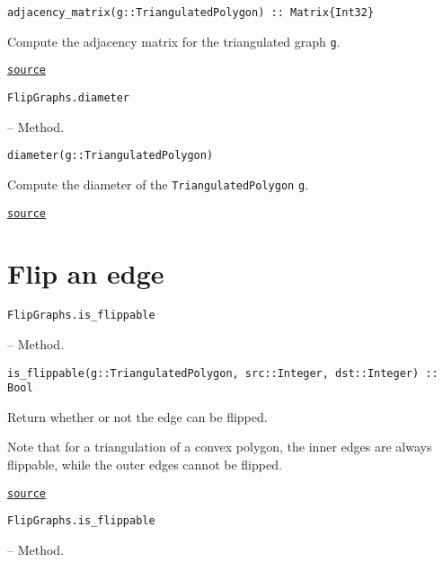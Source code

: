 \begin{adjustwidth}{2em}{0pt}


\begin{verbatim}
adjacency_matrix(g::TriangulatedPolygon) :: Matrix{Int32}
\end{verbatim}

Compute the adjacency matrix for the triangulated graph \texttt{g}. 



\href{https://github.com/schto223/FlipGraphs.jl/blob/490c01a7adf74b42f27dda05099165c47ae8133e/src/polygonTriangulations.jl#L240-L244}{\texttt{source}}


\end{adjustwidth}
\hypertarget{4612475216183140749}{\texttt{FlipGraphs.diameter}}  -- {Method.}

\begin{adjustwidth}{2em}{0pt}


\begin{verbatim}
diameter(g::TriangulatedPolygon)
\end{verbatim}

Compute the diameter of the \texttt{TriangulatedPolygon} \texttt{g}.



\href{https://github.com/schto223/FlipGraphs.jl/blob/490c01a7adf74b42f27dda05099165c47ae8133e/src/polygonTriangulations.jl#L231-L235}{\texttt{source}}


\end{adjustwidth}

\section{Flip an edge}



\label{11197232524932956081}{}

\hypertarget{1509616110747472477}{\texttt{FlipGraphs.is\_flippable}}  -- {Method.}

\begin{adjustwidth}{2em}{0pt}


\begin{verbatim}
is_flippable(g::TriangulatedPolygon, src::Integer, dst::Integer) :: Bool
\end{verbatim}

Return whether or not the edge can be flipped.

Note that for a triangulation of a convex polygon, the inner edges are always flippable,      while the outer edges cannot be flipped.    



\href{https://github.com/schto223/FlipGraphs.jl/blob/490c01a7adf74b42f27dda05099165c47ae8133e/src/polygonTriangulations.jl#L209-L216}{\texttt{source}}


\end{adjustwidth}
\hypertarget{2288003655784744554}{\texttt{FlipGraphs.is\_flippable}}  -- {Method.}

